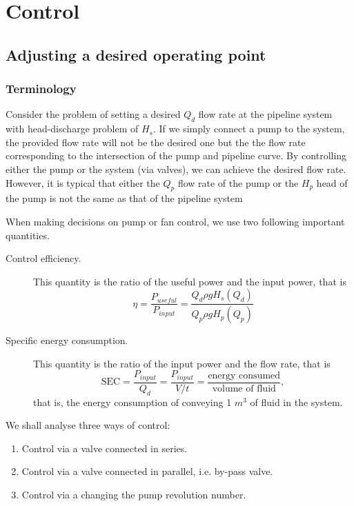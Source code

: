 \chapter{Control}

\section{Adjusting a desired operating point}

\subsection{Terminology}


Consider the problem of setting a desired $Q_d$ flow rate at the pipeline system with head-discharge problem of $H_s$. If we simply connect a pump to the system, the provided flow rate will not be the desired one but the the flow rate corresponding to the intersection of the pump and pipeline curve. By controlling either the pump or the system (via valves), we can achieve the desired flow rate. However, it is typical that either the $Q_p$ flow rate of the pump or the $H_p$ head of the pump is not the same as that of the pipeline system

When making decisions on pump or fan control, we use two following important quantities.

\begin{description}
\item[Control efficiency.] This quantity is the ratio of the useful power and the input power, that is
\begin{equation}
\eta=\frac{P_{useful}}{P_{input}}=\frac{Q_d \rho g H_s(Q_d)}{Q_p \rho g H_p(Q_p)}
\end{equation}
%
\item[Specific energy consumption.] This quantity is the ratio of the input power and the flow rate, that is
\begin{equation}
\text{SEC}=\frac{P_{input}}{Q_d}=\frac{P_{input}}{V/t}=\frac{\text{energy consumed}}{\text{volume of fluid}},
\end{equation}
that is, the energy consumption of conveying 1 $m^3$ of fluid in the system.
\end{description}

We shall analyse three ways of control:

\begin{enumerate}
\item Control via a valve connected in series.
\item Control via a valve connected in parallel, i.e. by-pass valve.
\item Control via a changing the pump revolution number.
\end{enumerate}

